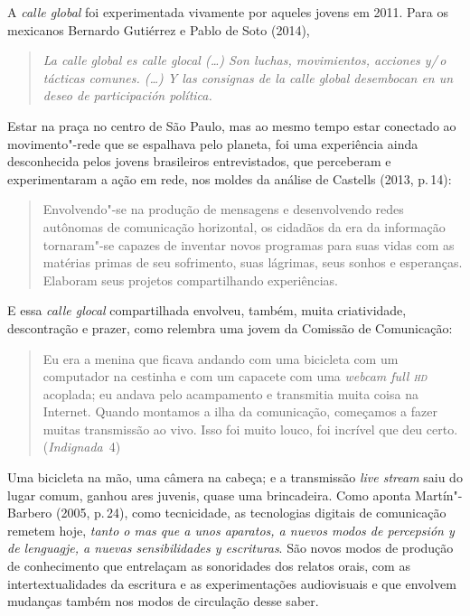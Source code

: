 A \textit{calle global} foi experimentada vivamente por aqueles jovens em
2011. Para os mexicanos Bernardo Gutiérrez e Pablo de Soto (2014),

\begin{quote}
\textit{La calle global es calle glocal (\ldots{}) Son luchas, movimientos,
acciones y/\,o tácticas comunes. (\ldots{}) Y las consignas de la calle global
desembocan en un deseo de participación política.}
\end{quote}

Estar na praça no centro de São Paulo, mas ao mesmo tempo estar
conectado ao movimento"-rede que se espalhava pelo planeta, foi uma
experiência ainda desconhecida pelos jovens brasileiros
entrevistados, que perceberam e experimentaram a ação em rede, nos
moldes da análise de Castells (2013, p.\,14):

\begin{quote}
Envolvendo"-se na produção de mensagens e desenvolvendo redes autônomas
de comunicação horizontal, os cidadãos da era da informação tornaram"-se
capazes de inventar novos programas para suas vidas com as matérias
primas de seu sofrimento, suas lágrimas, seus sonhos e esperanças.
Elaboram seus projetos compartilhando experiências.
\end{quote}

E essa \textit{calle glocal} compartilhada envolveu, também, muita
criatividade, descontração e prazer, como relembra uma jovem da Comissão
de Comunicação:

\begin{quote}
Eu era a menina que ficava andando com uma bicicleta com um
computador na cestinha e com um capacete com uma \textit{webcam full \textsc{hd}}
acoplada; eu andava pelo acampamento e transmitia muita coisa na
Internet. Quando montamos a ilha da comunicação, começamos a fazer
muitas transmissão ao vivo. Isso foi muito louco, foi incrível que deu
certo. (\textit{Indignada}~4)
\end{quote}

Uma bicicleta na mão, uma câmera na cabeça; e a transmissão \textit{live
stream} saiu do lugar comum, ganhou ares juvenis, quase uma brincadeira.
Como aponta Martín"-Barbero (2005, p.\,24), como tecnicidade, as
tecnologias digitais de comunicação remetem hoje, \textit{tanto o mas que a
unos aparatos, a nuevos modos de percepsión y de lenguagje, a nuevas
sensibilidades y escrituras}. São novos modos de produção de
conhecimento que entrelaçam as sonoridades dos relatos orais, com as
intertextualidades da escritura e as experimentações audiovisuais e que
envolvem mudanças também nos modos de circulação desse saber.

